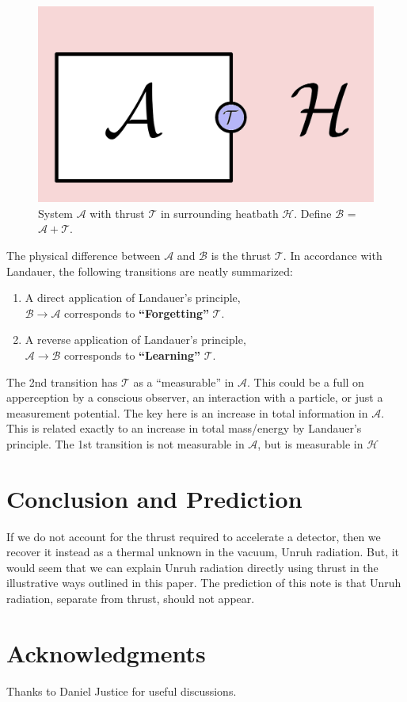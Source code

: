 \documentclass[12pt,a4paper]{article}
\begin{document}
\begin{figure}[h]
\centering
\includegraphics[scale=1.0]{pokeball.png}
\caption{System $\mathcal{A}$ with thrust $\mathcal{T}$ in surrounding heatbath $\mathcal{H}$.  Define $\mathcal{B}$ = $\mathcal{A} + \mathcal{T}$.}
\end{figure}

The physical difference between $\mathcal{A}$ and $\mathcal{B}$ is the thrust $\mathcal{T}$.  In accordance with Landauer, the following transitions are neatly summarized:
\begin{enumerate}
\item A direct application of Landauer's principle, \\ \hspace*{1 in} $\mathcal{B} \rightarrow \mathcal{A}$ corresponds to {\bf ``Forgetting''} $\mathcal{T}$.\\
\item A reverse application of Landauer's principle, \\ \hspace*{1 in} $\mathcal{A} \rightarrow \mathcal{B}$ corresponds to {\bf ``Learning''} $\mathcal{T}$.\\
\end{enumerate}
The 2nd transition has $\mathcal{T}$ as a ``measurable'' in $\mathcal{A}$. This could be a full on apperception by a conscious observer, an interaction with a particle, or just a measurement potential.  The key here is an increase in total information in $\mathcal{A}$.  This is related exactly to an increase in total mass/energy by Landauer's principle.  The 1st transition is not measurable in $\mathcal{A}$, but is measurable in $\mathcal{H}$


\section{Conclusion and Prediction}
If we do not account for the thrust required to accelerate a detector, then we recover it instead as a thermal unknown in the vacuum, Unruh radiation.  But, it would seem that we can explain Unruh radiation directly using thrust in the illustrative ways outlined in this paper.  The prediction of this note is that Unruh radiation, separate from thrust, should not appear.

\section{Acknowledgments}
Thanks to Daniel Justice for useful discussions.



\end{document}

